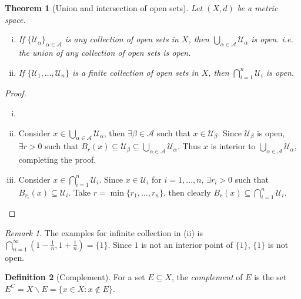 \documentclass[12pt, lettersize]{book}
\theoremstyle{plain}
\newtheorem{thm}{Theorem}[section]
\theoremstyle{definition}
\newtheorem{dfn}[thm]{Definition}
\theoremstyle{remark}
\newtheorem*{rem}{Remark}
\begin{document}
	\begin{thm}[Union and intersection of open sets]\label{thm: Union and intersection of open sets}
		Let $(X,d)$ be a metric space.
		\begin{enumerate}[(i)]
			\item If $\{\mathcal{U}_\alpha\}_{\alpha\in \mathcal{A}}$ is any collection of open sets in $X$, then $\bigcup_{\alpha\in \mathcal{A}}\mathcal{U}_\alpha$ is open. i.e. the union of \emph{any} collection of open sets is open.
			\item If $\{\mathcal{U}_1,\dots,\mathcal{U}_n\}$ is a finite collection of open sets in $X$, then $\bigcap_{i=1}^{n}\mathcal{U}_i$ is open.
		\end{enumerate}
	\end{thm}
	\begin{proof}
		\begin{enumerate}[(i)]
			\item[]
			\item Consider $x\in\bigcup_{\alpha\in \mathcal{A}}\mathcal{U}_\alpha$, then $\exists \beta\in\mathcal{A}$ such that $x\in\mathcal{U}_\beta$. Since $\mathcal{U}_\beta$ is open, $\exists r>0$ such that $B_r(x)\subseteq\mathcal{U}_\beta\subseteq\bigcup_{\alpha\in \mathcal{A}}\mathcal{U}_\alpha$. Thus $x$ is interior to $\bigcup_{\alpha\in \mathcal{A}}\mathcal{U}_\alpha$, completing the proof.
			\item Consider $x\in\bigcap_{i=1}^{n}\mathcal{U}_i$. Since $x\in\mathcal{U}_i$ for $i=1,\dots,n$, $\exists r_i>0$ such that $B_{r_i}(x)\subseteq\mathcal{U}_i$. Take $r=\min\{r_1,\dots,r_n\}$, then clearly $B_r(x)\subseteq\bigcap_{i=1}^{n}\mathcal{U}_i$.
		\end{enumerate}
	\end{proof}
	\begin{rem}
		The examples for infinite collection in (ii) is $\bigcap_{n=1}^{\infty}(1-\frac{1}{n}, 1+\frac{1}{n})=\{1\}$. Since $1$ is not an interior point of $\{1\}$, $\{1\}$ is not open.
	\end{rem}
	
	\begin{dfn}[Complement]
		For a set $E\subseteq X$, the \emph{complement} of $E$ is the set $E^C=X\backslash E=\{x\in X: x\notin E\}$.
	\end{dfn}
	
\end{document}
